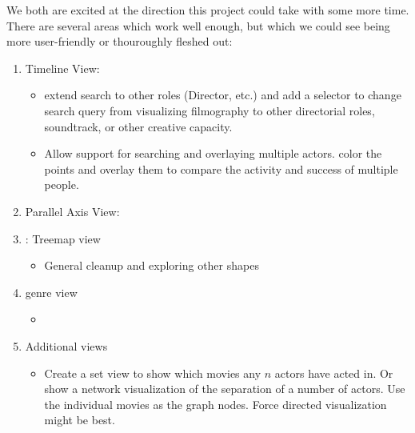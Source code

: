 \documentclass[12pt]{article}
\begin{document}
We both are excited at the direction this project could take with some more time.  There are several areas which work well enough, but which we could see being more user-friendly or thouroughly fleshed out:


\begin{enumerate}

	\item Timeline View:
		\begin{itemize}
			\item extend search to other roles (Director, etc.) and add a selector to change search query from visualizing filmography to other directorial roles, soundtrack, or other creative capacity.  
			\item Allow support for searching and overlaying multiple actors. color the points and overlay them to compare the activity and success of multiple people.
		\end{itemize}
		
	\item Parallel Axis View:
	
	\item: Treemap view
		\begin{itemize}
			\item General cleanup  and exploring other shapes
		\end{itemize}

	\item genre view
		\begin{itemize}
			\item 
		\end{itemize}
	\item Additional views
		\begin{itemize}
			\item Create a set view to show which movies any $n$ actors have acted in.  Or show a network visualization of the separation of a number of actors.  Use the individual movies as the graph nodes.  Force directed visualization might be best.
		\end{itemize}
\end{enumerate}
\end{document}
